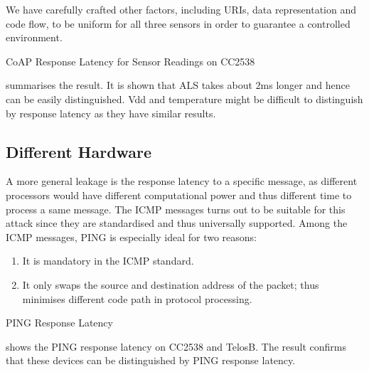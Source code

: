 We have carefully crafted other factors, including URIs, data representation and code flow, to be uniform for all three sensors in order to guarantee a controlled environment.

\begin{table}
	\center
	
	\caption{CoAP Response Latency for Sensor Readings on CC2538\label{CoapTiming}}
\end{table}

 summarises the result. It is shown that ALS takes about $2$ms longer and hence can be easily distinguished. Vdd and temperature might be difficult to distinguish by response latency as they have similar results.



\subsection{Different Hardware}

A more general leakage is the response latency to a specific message, as different processors would have different computational power and thus different time to process a same message. The ICMP messages turns out to be suitable for this attack since they are standardised and thus universally supported. Among the ICMP messages, PING is especially ideal for two reasons: 
\begin{enumerate}
	\item It is mandatory in the ICMP standard.
	\item It only swaps the source and destination address of the packet; thus minimises different code path in protocol processing.
\end{enumerate}

\begin{table}
	\center
	
	\caption{PING Response Latency\label{PingResponse}}
\end{table}

 shows the PING response latency on CC2538 and TelosB. The result confirms that these devices can be distinguished by PING response latency.

